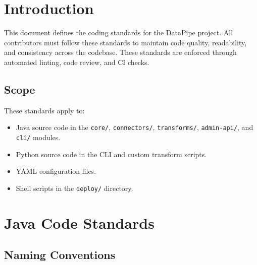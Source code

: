 \documentclass[
    language=english,
    doctype=standard,
    institution=none,
    titlestyle=book,
    oneside,
]{../../omnilatex}
\begin{document}
\maketitle

\tableofcontents

\chapter{Introduction}
\label{sec:introduction}

This document defines the coding standards for the DataPipe project. All
contributors must follow these standards to maintain code quality,
readability, and consistency across the codebase. These standards are
enforced through automated linting, code review, and CI checks.

\section{Scope}

These standards apply to:

\begin{itemize}
    \item Java source code in the \texttt{core/}, \texttt{connectors/},
        \texttt{transforms/}, \texttt{admin-api/}, and \texttt{cli/}
        modules.
    \item Python source code in the CLI and custom transform scripts.
    \item YAML configuration files.
    \item Shell scripts in the \texttt{deploy/} directory.
\end{itemize}

\chapter{Java Code Standards}
\label{sec:java}

\section{Naming Conventions}
\end{document}
